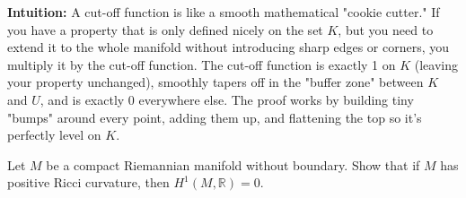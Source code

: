 \begin{solution}
\textbf{Intuition:}
A cut-off function is like a smooth mathematical "cookie cutter." If you have a property that is only defined nicely on the set $K$, but you need to extend it to the whole manifold without introducing sharp edges or corners, you multiply it by the cut-off function. The cut-off function is exactly 1 on $K$ (leaving your property unchanged), smoothly tapers off in the "buffer zone" between $K$ and $U$, and is exactly 0 everywhere else. The proof works by building tiny "bumps" around every point, adding them up, and flattening the top so it's perfectly level on $K$.
\end{solution}

\begin{exercise}
\label{geometry:2016:5}
Let $M$ be a compact Riemannian manifold without boundary. Show that if $M$ has positive Ricci curvature, then $H^{1}(M, \mathbb{R}) = 0$.
\end{exercise}

